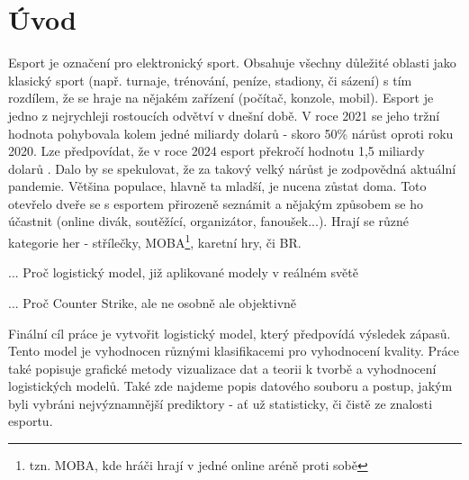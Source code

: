 \chapter{Úvod}
Esport je označení pro elektronický sport. Obsahuje všechny důležité oblasti jako klasický sport (např. turnaje, trénování, peníze, stadiony, či sázení) s tím rozdílem, že se hraje
na nějakém zařízení (počítač, konzole, mobil).
Esport je jedno z nejrychleji rostoucích odvětví v dnešní době. V roce 2021 se jeho tržní hodnota pohybovala kolem jedné miliardy dolarů - skoro
50\% nárůst oproti roku 2020. Lze předpovídat, že v roce 2024 esport překročí hodnotu 1,5 miliardy dolarů \cite{Gough2021}.
Dalo by se spekulovat, že za takový velký nárůst je zodpovědná aktuální pandemie. Většina populace, hlavně ta mladší, je nucena zůstat doma. Toto otevřelo dveře
se s esportem přirozeně seznámit a nějakým způsobem se ho účastnit (online divák, soutěžící, organizátor, fanoušek...). 
Hrají se různé kategorie her - střílečky, \acl{MOBA}\footnote{tzn. MOBA, kde hráči hrají v jedné online aréně proti sobě}, karetní hry, či \acl{BR}.

... Proč logistický model, již aplikované modely v reálném světě

... Proč Counter Strike, ale ne osobně ale objektivně

Finální cíl práce je vytvořit logistický model, který předpovídá výsledek zápasů. Tento model je vyhodnocen různými klasifikacemi pro vyhodnocení kvality.
Práce také popisuje grafické metody vizualizace dat a teorii k tvorbě a vyhodnocení logistických modelů. Také zde najdeme popis datového souboru a postup,
jakým byli vybráni nejvýznamnější prediktory - ať už statisticky, či čistě ze znalosti esportu. 
